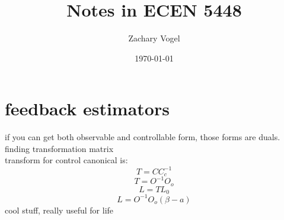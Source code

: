 \documentclass{article}
\author{Zachary Vogel}
\date{\today}
\title{Notes in ECEN 5448}
\begin{document}
\maketitle


\section*{feedback estimators}
if you can get both observable and controllable form, those forms are duals.\\
finding transformation matrix\\
transform for control canonical is:
\[T=CC_c^{-1}\]
\[T=O^{-1}O_o\]
\[L=TL_0\]
\[L=O^{-1}O_o(\beta-a)\]
cool stuff, really useful for life
\end{document}
